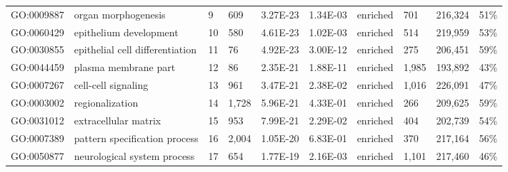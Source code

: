 \begin{sidewaystable}[!ht]
\begin{tabular}{lp{2cm}p{1cm}p{1cm}p{1.25cm}p{1.25cm}p{1cm}p{1.25cm}p{1.25cm}p{1.25cm}}
GO:0009887     & organ morphogenesis                & 9                          & 609                 & 3.27E-23                      & 1.34E-03               & enriched        & 701                  & 216,324                & 51\%                     \\
GO:0060429     & epithelium development             & 10                         & 580                 & 4.61E-23                      & 1.02E-03               & enriched        & 514                  & 219,959                & 53\%                     \\
GO:0030855     & epithelial cell differentiation    & 11                         & 76                  & 4.92E-23                      & 3.00E-12               & enriched        & 275                  & 206,451                & 59\%                     \\
GO:0044459     & plasma membrane part               & 12                         & 86                  & 2.35E-21                      & 1.88E-11               & enriched        & 1,985                & 193,892                & 43\%                     \\
GO:0007267     & cell-cell signaling                & 13                         & 961                 & 3.47E-21                      & 2.38E-02               & enriched        & 1,016                & 226,091                & 47\%                     \\
GO:0003002     & regionalization                    & 14                         & 1,728               & 5.96E-21                      & 4.33E-01               & enriched        & 266                  & 209,625                & 59\%                     \\
GO:0031012     & extracellular matrix               & 15                         & 953                 & 7.99E-21                      & 2.29E-02               & enriched        & 404                  & 202,739                & 54\%                     \\
GO:0007389     & pattern specification process      & 16                         & 2,004               & 1.05E-20                      & 6.83E-01               & enriched        & 370                  & 217,164                & 56\%                     \\
GO:0050877     & neurological system process        & 17                         & 654                 & 1.77E-19                      & 2.16E-03               & enriched        & 1,101                & 217,460                & 46\%                     \\

\end{tabular}
\end{sidewaystable}
